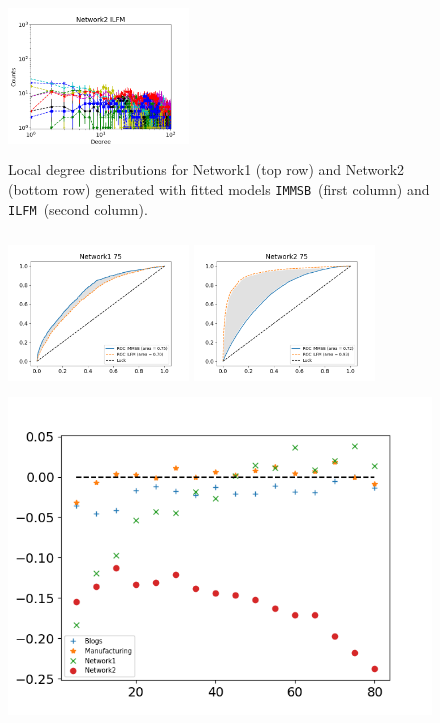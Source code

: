 \documentclass[journal]{IEEEtran}
\newcommand{\ifm}{\texttt{ILFM}}
\newcommand{\imb}{\texttt{IMMSB}}
\begin{document}
\begin{figure}[h]
\begin{minipage}{0.24\textwidth}
        \includegraphics[width=4.8cm,height=4.2cm]{img/corpus/ilfm_network2_1}
    \end{minipage}
    \caption {Local degree distributions for Network1 (top row) and Network2 (bottom row) generated with fitted models \imb\ (first column) and \ifm\ (second column).} 
\label{fig:me_local}
\end{figure}

\begin{figure}[h]
\centering
    \begin{minipage}{0.24\textwidth}
        \includegraphics[width=4.8cm,height=4.2cm]{img/corpus/roc_network1_75_f}
    \end{minipage}
    \begin{minipage}{0.24\textwidth}
        \includegraphics[width=4.8cm,height=4.2cm]{img/corpus/roc_network2_75_f}
    \end{minipage}
    \begin{minipage}{0.5\textwidth}
        \includegraphics[width=\textwidth]{img/corpus/testset_max_20.png}

\end{minipage}
\end{figure}
\end{document}
